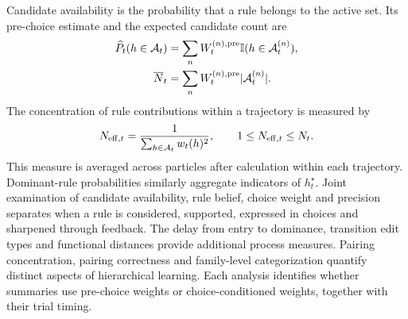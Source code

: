 Candidate availability is the probability that a rule belongs to the active set. Its pre-choice estimate and the expected candidate count are
\begin{align}
\widehat P_t(h\in\mathcal A_t)&=
\sum_nW_t^{(n),{\rm pre}}\mathbb I(h\in\mathcal A_t^{(n)}),\\
\overline N_t&=\sum_nW_t^{(n),{\rm pre}}|\mathcal A_t^{(n)}|.
\label{eq:availability-measures}
\end{align}
The concentration of rule contributions within a trajectory is measured by
\begin{equation}
N_{{\rm eff},t}=\frac1{\sum_{h\in\mathcal A_t}w_t(h)^2},
\qquad 1\leq N_{{\rm eff},t}\leq N_t.
\label{eq:effective-rule-participation}
\end{equation}
This measure is averaged across particles after calculation within each trajectory. Dominant-rule probabilities similarly aggregate indicators of $h_t^{\star}$. Joint examination of candidate availability, rule belief, choice weight and precision separates when a rule is considered, supported, expressed in choices and sharpened through feedback. The delay from entry to dominance, transition edit types and functional distances provide additional process measures. Pairing concentration, pairing correctness and family-level categorization quantify distinct aspects of hierarchical learning. Each analysis identifies whether summaries use pre-choice weights or choice-conditioned weights, together with their trial timing.
